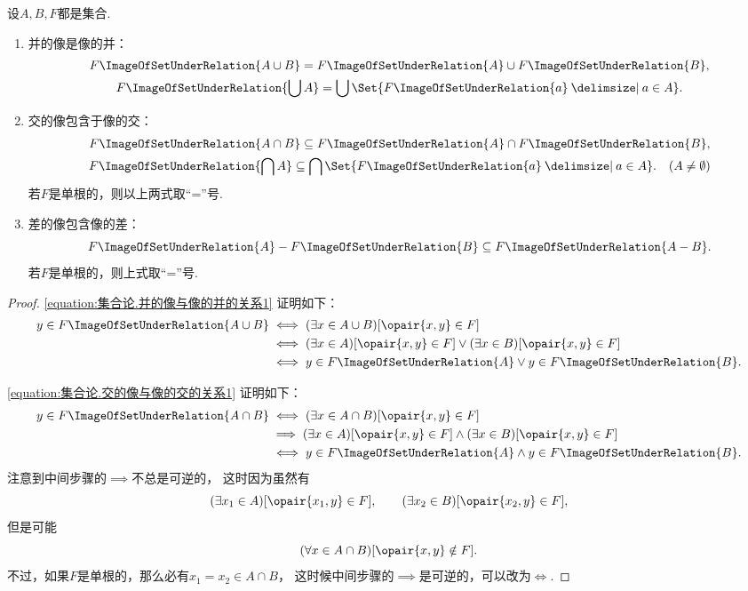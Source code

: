 \begin{theorem}
设\(A,B,F\)都是集合.
\def\F#1{F\ImageOfSetUnderRelation{#1}}
\begin{enumerate}
	\item 并的像是像的并：\begin{gather}
		\F{A \cup B}
		= \F{A} \cup \F{B},
		\label{equation:集合论.并的像与像的并的关系1} \\
		\F{\bigcup A}
		= \bigcup\Set{ \F{a} \given a \in A }.
		\label{equation:集合论.并的像与像的并的关系2}
	\end{gather}

	\item 交的像包含于像的交：\begin{gather}
		\F{A \cap B}
		\subseteq \F{A} \cap \F{B},
		\label{equation:集合论.交的像与像的交的关系1} \\
		\F{\bigcap A}
		\subseteq \bigcap\Set{ \F{a} \given a \in A }.
		\label{equation:集合论.交的像与像的交的关系2}
		\quad(A \neq \emptyset)
	\end{gather}
	若\(F\)是单根的，则以上两式取“=”号.

	\item 差的像包含像的差：\begin{equation}
		\F{A} - \F{B}
		\subseteq \F{A-B}.
		\label{equation:集合论.差的像与像的差的关系}
	\end{equation}
	若\(F\)是单根的，则上式取“=”号.
\end{enumerate}
\begin{proof}
\cref{equation:集合论.并的像与像的并的关系1} 证明如下：
\begin{align*}
	y \in \F{A \cup B}
	&\iff (\exists x \in A \cup B)[\opair{x,y} \in F] \\
	&\iff (\exists x \in A)[\opair{x,y} \in F]
			\lor (\exists x \in B)[\opair{x,y} \in F] \\
	&\iff y \in \F{A} \lor y \in \F{B}.
\end{align*}

\cref{equation:集合论.交的像与像的交的关系1} 证明如下：
\begin{align*}
	y \in \F{A \cap B}
	&\iff (\exists x \in A \cap B)[\opair{x,y} \in F] \\
	&\implies (\exists x \in A)[\opair{x,y} \in F]
		\land (\exists x \in B)[\opair{x,y} \in F] \\
	&\iff y \in \F{A} \land y \in \F{B}.
\end{align*}
注意到中间步骤的\(\implies\)不总是可逆的，
这时因为虽然有\begin{equation*}
	(\exists x_1 \in A)[\opair{x_1,y} \in F], \qquad
	(\exists x_2 \in B)[\opair{x_2,y} \in F],
\end{equation*}
但是可能\begin{equation*}
	(\forall x \in A \cap B)[\opair{x,y} \notin F].
\end{equation*}
不过，如果\(F\)是单根的，那么必有\(x_1 = x_2 \in A \cap B\)，
这时候中间步骤的\(\implies\)是可逆的，可以改为\(\iff\).


\end{proof}
\end{theorem}
